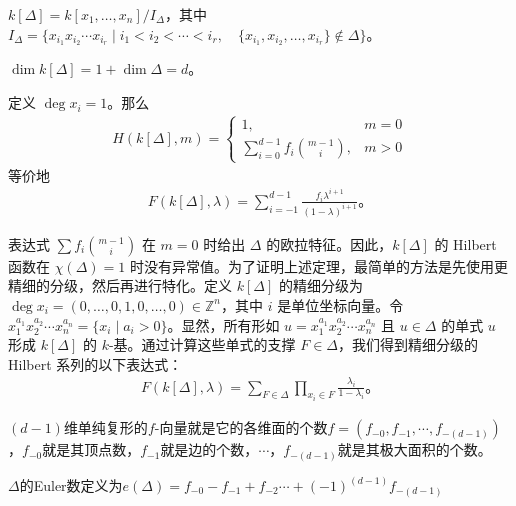 \begin{definition}
$k[\Delta] = k[x_1, \ldots, x_n]/I_\Delta$，其中
$I_\Delta = \{x_{i_1} x_{i_2} \cdots x_{i_r} \mid i_1 < i_2 < \cdots < i_r,\quad \{x_{i_1}, x_{i_2}, \ldots, x_{i_r}\} \notin \Delta\}。$
\end{definition}

\begin{theoreminner}
$ \dim k[\Delta] = 1 + \dim \Delta = d。 $
\end{theoreminner}

\begin{theoreminner}
定义 $\deg x_i = 1$。那么
\begin{align}
H(k[\Delta], m) = \begin{cases} 
1, & m = 0 \\
\sum _{i=0}^{d-1}f_i \binom{m-1}{i}, & m > 0 
\end{cases}
\end{align}
等价地
\begin{align}
F(k[\Delta], \lambda) = \sum_{i=-1}^{d-1} \frac{f_i \lambda^{i+1}}{(1 - \lambda)^{i+1}}。
\end{align}
\end{theoreminner}


\begin{remark}
表达式 $\sum f_i \binom{m-1}{i}$ 在 $m = 0$ 时给出 $\Delta$ 的欧拉特征。因此，$k[\Delta]$ 的 Hilbert 函数在 $\chi(\Delta) = 1$ 时没有异常值。为了证明上述定理，最简单的方法是先使用更精细的分级，然后再进行特化。定义 $k[\Delta]$ 的精细分级为 $\deg x_i = (0, \ldots, 0, 1, 0, \ldots, 0) \in \mathbb{Z}^n$，其中 $i$ 是单位坐标向量。令 $x_1^{a_1} x_2^{a_2} \cdots x_n^{a_n} = \{x_i \mid a_i > 0\}$。显然，所有形如 $u = x_1^{a_1} x_2^{a_2} \cdots x_n^{a_n}$ 且 $u \in \Delta$ 的单式 $u$ 形成 $k[\Delta]$ 的 $k$-基。通过计算这些单式的支撑 $F \in \Delta$，我们得到精细分级的 Hilbert 系列的以下表达式：
\begin{align*}
 F(k[\Delta], \lambda) = \sum_{F \in \Delta} \prod_{x_i \in F} \frac{\lambda_i}{1 - \lambda_i}。
\end{align*}
\end{remark}

\begin{definition}
$(d-1)$维单纯复形的$f$-向量就是它的各维面的个数$f=(f_{-0}, f_{-1}, \cdots, f_{-(d-1)})$，$f_{-0}$就是其顶点数，$f_{-1}$就是边的个数，$\cdots$，$f_{-(d-1)}$就是其极大面积的个数。
\end{definition}

\begin{definition}
$\Delta$的Euler数定义为$e(\Delta)=f_{-0}-f_{-1}+f_{-2}\cdots+(-1)^{(d-1)}f_{-(d-1)}$
\end{definition}

